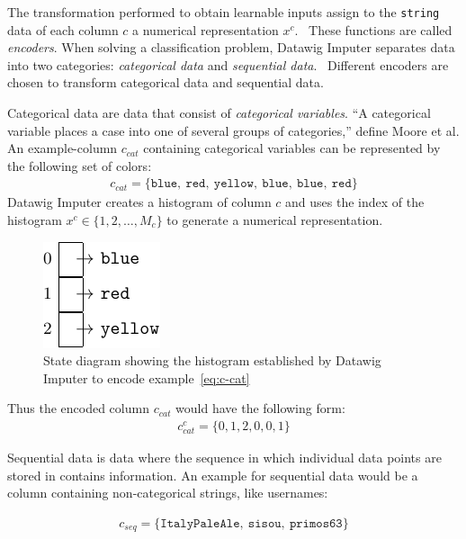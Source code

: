 The transformation performed to obtain learnable inputs assign to the \texttt{string} data of each column \( c \) a numerical representation \( x^c \).~\cite[p.~2020]{BIE18}
These functions are called \emph{encoders}.
When solving a classification problem, Datawig Imputer separates data into two categories: \emph{categorical data} and \emph{sequential data}.~\cite[p.~2017]{BIE18}
Different encoders are chosen to transform categorical data and sequential data.

Categorical data are data that consist of \emph{categorical variables}.
``A categorical variable places a case into one of several groups of categories,{''} define Moore et al.\cite[p.~4]{MOO11}
An example-column \( c_{cat} \) containing categorical variables can be represented by the following set of colors:
\begin{align}\label{eq:c-cat}
    c_{cat} = \{ \texttt{blue},~\texttt{red},~\texttt{yellow},~\texttt{blue},~\texttt{blue},~\texttt{red} \}
\end{align}
Datawig Imputer creates a histogram of column \( c \) and uses the index of the histogram \( x^c \in \{1, 2, \dots, M_c \} \) to generate a numerical representation.
\begin{figure}[ht]
    \centering
    \includegraphics[width=.3\textwidth]{images/state_diagrams/color_histogram}
    \caption{State diagram showing the histogram established by Datawig Imputer to encode example~\ref{eq:c-cat}}
    \label{fig:state-diagram-color}
\end{figure}
Thus the encoded column \( c_{cat} \) would have the following form:
\begin{align*}
    c_{cat}^{c} = \{ 0, 1, 2, 0, 0, 1\}
\end{align*}

Sequential data is data where the sequence in which individual data points are stored in contains information.
An example for sequential data would be a column containing non-categorical strings, like usernames:

\begin{align*}
    c_{seq} = \{ \texttt{ItalyPaleAle},~\texttt{sisou},~\texttt{primos63} \}
\end{align*}

